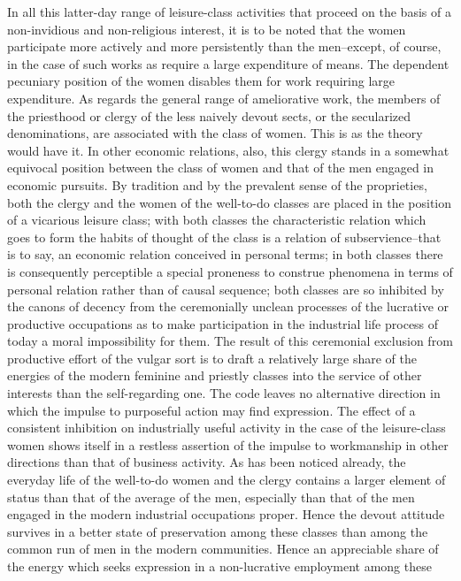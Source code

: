 \documentclass[12pt]{report}
\begin{document}
In all this latter-day range of leisure-class activities that proceed
on the basis of a non-invidious and non-religious interest, it is to
be noted that the women participate more actively and more persistently
than the men--except, of course, in the case of such works as require
a large expenditure of means. The dependent pecuniary position of the
women disables them for work requiring large expenditure. As regards
the general range of ameliorative work, the members of the priesthood
or clergy of the less naively devout sects, or the secularized
denominations, are associated with the class of women. This is as the
theory would have it. In other economic relations, also, this clergy
stands in a somewhat equivocal position between the class of women and
that of the men engaged in economic pursuits. By tradition and by the
prevalent sense of the proprieties, both the clergy and the women of
the well-to-do classes are placed in the position of a vicarious leisure
class; with both classes the characteristic relation which goes to form
the habits of thought of the class is a relation of subservience--that
is to say, an economic relation conceived in personal terms; in both
classes there is consequently perceptible a special proneness to
construe phenomena in terms of personal relation rather than of causal
sequence; both classes are so inhibited by the canons of decency from
the ceremonially unclean processes of the lucrative or productive
occupations as to make participation in the industrial life process
of today a moral impossibility for them. The result of this ceremonial
exclusion from productive effort of the vulgar sort is to draft a
relatively large share of the energies of the modern feminine
and priestly classes into the service of other interests than the
self-regarding one. The code leaves no alternative direction in which
the impulse to purposeful action may find expression. The effect of a
consistent inhibition on industrially useful activity in the case of the
leisure-class women shows itself in a restless assertion of the impulse
to workmanship in other directions than that of business activity. As
has been noticed already, the everyday life of the well-to-do women and
the clergy contains a larger element of status than that of the average
of the men, especially than that of the men engaged in the modern
industrial occupations proper. Hence the devout attitude survives in a
better state of preservation among these classes than among the common
run of men in the modern communities. Hence an appreciable share of the
energy which seeks expression in a non-lucrative employment among these
\end{document}
